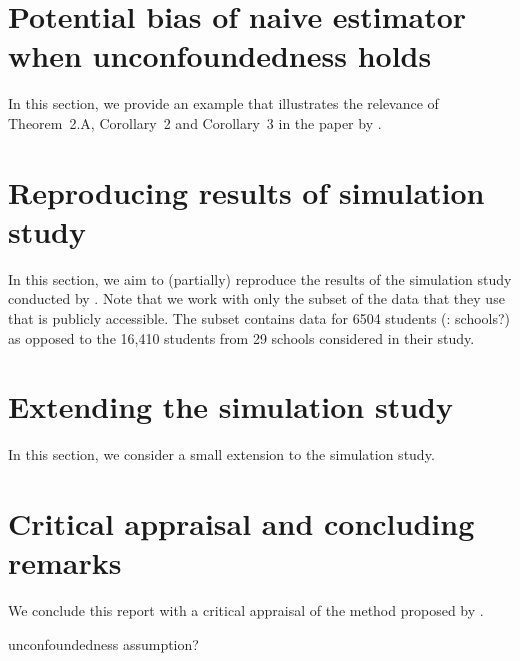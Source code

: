 \documentclass[10pt]{article}
\begin{document}
\section{Potential bias of naive estimator when unconfoundedness holds}

\todo In this section, we provide an example that illustrates the relevance of Theorem~2.A, Corollary~2 and Corollary~3 in the paper by \textcite{Forastiere:2021}.
\\


\section{Reproducing results of simulation study}

\todo In this section, we aim to (partially) reproduce the results of the simulation study conducted by \textcite{Forastiere:2021}. Note that we work with only the subset of the data that they use that is publicly accessible. The subset contains data for 6504 students (\todo: schools?) as opposed to the 16,410 students from 29 schools considered in their study.
\\


\section{Extending the simulation study}

\todo In this section, we consider a small extension to the simulation study.
\\


\section{Critical appraisal and concluding remarks}

\todo We conclude this report with a critical appraisal of the method proposed by \textcite{Forastiere:2021}.

\todo unconfoundedness assumption? \textcite{Sanchez:2021}


\newpage


\begin{refcontext}[sorting=nyt]
\printbibliography
\end{refcontext}




\end{document}
